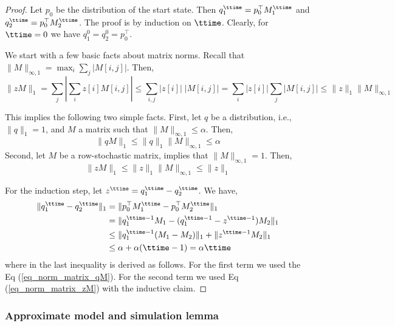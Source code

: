 \begin{proof}
Let $p_0$ be the distribution of the start state. Then
$q_1^\ttime=p_0^\top M_1^\ttime$ and $q_2^\ttime=p_0^\top
M_2^\ttime$. The proof is by induction on $\ttime$. Clearly, for
$\ttime=0$ we have $q_1^0=q_2^0=p_0^\top$.

We start with a few basic facts about matrix norms. Recall that
$\|M\|_{\infty,1} = \max_i \sum_j |M[i,j]|$. Then,
\begin{equation}
\label{eq_norm_matrix_1}
%
\| z M\|_1 = \sum_j | \sum_i z[i] M[i,j]|\leq \sum_{i,j} |z[i]|\;
|M[i,j] | = \sum_i |z[i]| \sum_j  |M[i,j]| \leq \|z\|_1
\|M\|_{\infty,1}
\end{equation}

This implies the following two simple facts. First, let $q$ be a
distribution, i.e., $\|q\|_1=1$, and $M$ a matrix such that
$\|M\|_{\infty,1} \leq \alpha $. Then,
\begin{equation}
\label{eq_norm_matrix_qM} \|qM\|_1 \leq \|q\|_1 \|M\|_{\infty,1}
 \leq \alpha
\end{equation}
Second, let $M$ be a row-stochastic matrix,  implies that
$\|M\|_{\infty,1}=1$. Then,
\begin{equation}
\label{eq_norm_matrix_zM} \|zM\|_1 \leq \|z\|_1 \|M\|_{\infty,1}
\leq \|z\|_1
\end{equation}

For the induction step, let $z^\ttime=q_1^\ttime-q_2^\ttime$. We
have,
\begin{align*}
\|q_1^\ttime-q_2^\ttime\|_1 &= \|p_0^\top M_1^\ttime-p_0^\top M_2^\ttime\|_1\\
&= \|q_1^{\ttime-1}M_1 - (q_1^{\ttime-1}-z^{\ttime-1})M_2\|_1\\
&\leq \|q_1^{\ttime-1} (M_1-M_2)\|_1 + \|z^{\ttime-1}M_2\|_1\\
&\leq \alpha + \alpha (\ttime-1) = \alpha\ttime
\end{align*}
where in the last inequality is derived as follows. For the first
term we used the Eq (\ref{eq_norm_matrix_qM}). For the second term we
used Eq (\ref{eq_norm_matrix_zM}) with the inductive claim.
\end{proof}

\subsubsection{Approximate model and simulation lemma}

